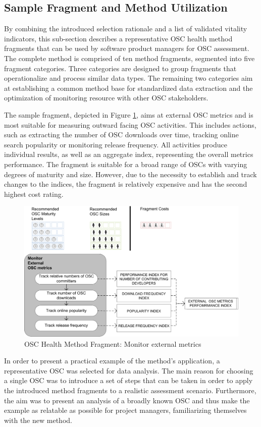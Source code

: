 \documentclass[final,5p,times,twocolumn]{elsarticle}
\begin{document}
\subsection{Sample Fragment and Method Utilization}
By combining the introduced selection rationale and a list of validated vitality indicators, this sub-section describes a representative OSC health method fragments that can be used by software product managers for OSC assessment. The complete method is comprised of ten method fragments, segmented into five fragment categories. Three categories are  designed to group fragments that operationalize and process similar data types. The remaining two categories aim at establishing a common method base for standardized data extraction and the optimization of monitoring resource with other OSC stakeholders.

The sample fragment, depicted in Figure \ref{fig:OSC_method_fragment}, aims at external OSC metrics and is most suitable for measuring outward facing OSC activities. This includes actions, such as extracting the number of OSC downloads over time, tracking online search popularity or monitoring release frequency. All activities produce individual results, as well as an aggregate index, representing the overall metrics performance. The fragment is suitable for a broad range of OSCs with varying degrees of maturity and size. However, due to the necessity to establish and track changes to the indices, the fragment is relatively expensive and has the second highest cost rating.
\begin{figure}
\begin{center}
\includegraphics[scale=0.7]{figures/monitor_external_metrics.png}
\caption{OSC Health Method Fragment: Monitor external metrics}
\label{fig:OSC_method_fragment}
\end{center}
\end{figure}   
In order to present a practical example of the method’s application, a representative OSC was selected for data analysis. The main reason for choosing a single OSC was to introduce a set of steps that can be taken in order to apply the introduced method fragments to a realistic assessment scenario. Furthermore, the aim was to present an analysis of a broadly known OSC and thus make the example as relatable as possible for project managers, familiarizing themselves with the new method. 
\end{document}
